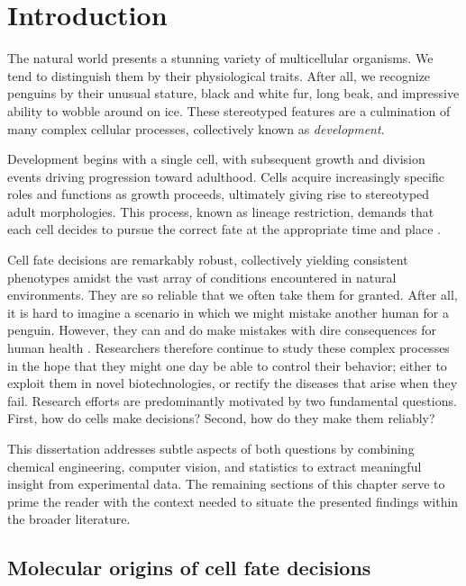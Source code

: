 
\graphicspath{ {figures/introduction/} }

\chapter{Introduction}
\label{ch:intro}

The natural world presents a stunning variety of multicellular organisms. We tend to distinguish them by their physiological traits. After all, we recognize penguins by their unusual stature, black and white fur, long beak, and impressive ability to wobble around on ice. These stereotyped features are a culmination of many complex cellular processes, collectively known as \emph{development}.

Development begins with a single cell, with subsequent growth and division events driving progression toward adulthood. Cells acquire increasingly specific roles and functions as growth proceeds, ultimately giving rise to stereotyped adult morphologies. This process, known as lineage restriction, demands that each cell decides to pursue the correct fate at the appropriate time and place \cite{Wilkins1993}.

Cell fate decisions are remarkably robust, collectively yielding consistent phenotypes amidst the vast array of conditions encountered in natural environments. They are so reliable that we often take them for granted. After all, it is hard to imagine a scenario in which we might mistake another human for a penguin. However, they can and do make mistakes with dire consequences for human health \cite{Immuno2010,Wang2009,Hornberg2006}. Researchers therefore continue to study these complex processes in the hope that they might one day be able to control their behavior; either to exploit them in novel biotechnologies, or rectify the diseases that arise when they fail. Research efforts are predominantly motivated by two fundamental questions. First, how do cells make decisions? Second, how do they make them reliably? 

This dissertation addresses subtle aspects of both questions by combining chemical engineering, computer vision, and statistics to extract meaningful insight from experimental data. The remaining sections of this chapter serve to prime the reader with the context needed to situate the presented findings within the broader literature. 

\section{Molecular origins of cell fate decisions}

